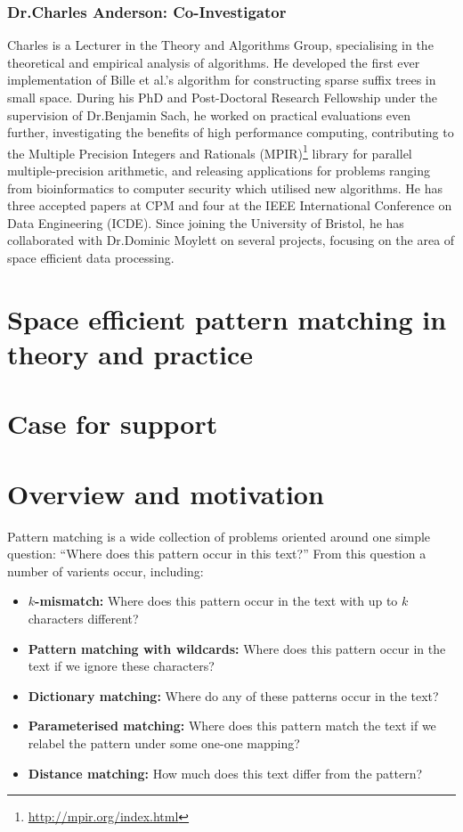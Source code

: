 \documentclass[a4paper,11pt]{article}
\begin{document}
    \subsubsection*{Dr.\@ Charles Anderson: Co-Investigator}

    Charles is a Lecturer in the Theory and Algorithms Group, specialising in the theoretical and empirical analysis of algorithms. He developed the first ever implementation of Bille et al.'s algorithm for constructing sparse suffix trees in small space. During his PhD and Post-Doctoral Research Fellowship under the supervision of Dr.\@ Benjamin Sach, he worked on practical evaluations even further, investigating the benefits of high performance computing, contributing to the Multiple Precision Integers and Rationals (MPIR)\footnote{\url{http://mpir.org/index.html}} library for parallel multiple-precision arithmetic, and releasing applications for problems ranging from bioinformatics to computer security which utilised new algorithms. He has three accepted papers at CPM and four at the IEEE International Conference on Data Engineering (ICDE). Since joining the University of Bristol, he has collaborated with Dr.\@ Dominic Moylett on several projects, focusing on the area of space efficient data processing.

    \newpage
    \section*{Space efficient pattern matching in theory and practice}
    \section*{Case for support}

    \section{Overview and motivation}

    Pattern matching is a wide collection of problems oriented around one simple question: ``Where does this pattern occur in this text?'' From this question a number of varients occur, including:

    \begin{itemize}
        \item \textbf{$k$-mismatch:} Where does this pattern occur in the text with up to $k$ characters different?
        \item \textbf{Pattern matching with wildcards:} Where does this pattern occur in the text if we ignore these characters?
        \item \textbf{Dictionary matching:} Where do any of these patterns occur in the text?
        \item \textbf{Parameterised matching:} Where does this pattern match the text if we relabel the pattern under some one-one mapping?
        \item \textbf{Distance matching:} How much does this text differ from the pattern?
    \end{itemize}
\end{document}
